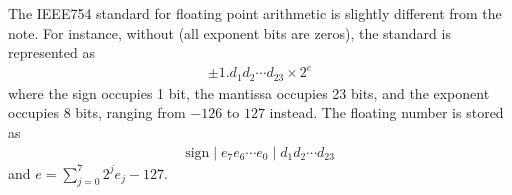 \documentclass[letterpaper,10pt,english]{jupyterBook}
\begin{document}
\begin{sphinxShadowBox}

\sphinxAtStartPar
The IEEE754 standard for floating point arithmetic is slightly different from the note. For instance, without  (all exponent bits are zeros), the standard  is represented as
\begin{equation*}
\begin{split}\pm 1.d_1 d_2\cdots d_{23} \times 2^e\end{split}
\end{equation*}
\sphinxAtStartPar
where the sign occupies 1 bit, the mantissa occupies 23 bits, and the exponent occupies 8 bits, ranging from \(-126\) to \(127\) instead. The floating number is stored as
\begin{equation*}
\begin{split}\text{sign} \mid e_7 e_6 \cdots e_0 \mid d_1 d_2\cdots d_{23}\end{split}
\end{equation*}
\sphinxAtStartPar
and \(e = \sum_{j=0}^7 2^{j} e_j - 127\).
\end{sphinxShadowBox}
\end{document}
